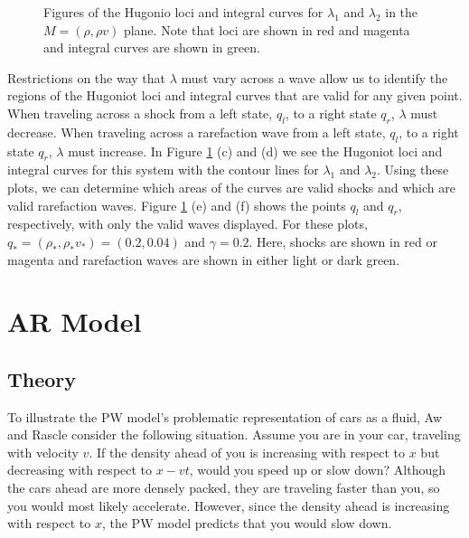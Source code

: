 \documentclass{article}
\begin{document}
\begin{figure}[H]
{   }
 \caption[Optional caption for list of figures]
 {Figures of the Hugonio loci and integral curves for $\lambda_1$ and $\lambda_2$ in the $M = (\rho, \rho v)$ plane. Note that loci are shown in red and magenta and integral curves are shown in green.}
  \label{fig:PW_curves}
\end{figure}

Restrictions on the way that $\lambda$ must vary across a wave allow us to identify the regions of the Hugoniot loci and integral curves that are valid for any given point. When traveling across a shock from a left state, $q_l$, to a right state $q_r$, $\lambda$ must decrease. When traveling across a rarefaction wave from a left state, $q_l$, to a right state $q_r$, $\lambda$ must increase. In Figure \ref{fig:PW_curves} (c) and (d) we see the Hugoniot loci and integral curves for this system with the contour lines for $\lambda_1$ and $\lambda_2$. Using these plots, we can determine which areas of the curves are valid shocks and which are valid rarefaction waves. Figure \ref{fig:PW_curves} (e) and (f) shows the points $q_l$ and $q_r$, respectively, with only the valid waves displayed. For these plots,
$q_* = (\rho_*,\rho_*v_*) = (0.2, 0.04)$ and $\gamma = 0.2$. 
Here, shocks are shown in red or magenta and rarefaction waves are shown in either light or dark green.

\section{AR Model}

\subsection{Theory}
To illustrate the PW model's problematic representation of cars as a fluid, Aw and Rascle \cite{AwRascle2000} consider the following situation.  Assume you are in your car, traveling with velocity $v$.  If the density ahead of you is increasing with respect to $x$ but decreasing with respect to $x - vt$, would you speed up or slow down?  Although the cars ahead are more densely packed, they are traveling faster than you, so you would most likely accelerate.  However, since the density ahead is increasing with respect to $x$, the PW model predicts that you would slow down.  
\end{document}
